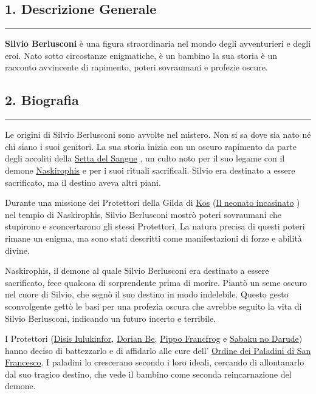 \subsection{1. Descrizione Generale}\label{descrizione-generale}

\begin{center}\rule{0.5\linewidth}{0.5pt}\end{center}

\textbf{Silvio Berlusconi} è una figura straordinaria nel mondo degli
avventurieri e degli eroi. Nato sotto circostanze enigmatiche, è un
bambino la sua storia è un racconto avvincente di rapimento, poteri
sovraumani e profezie oscure.

\subsection{2. Biografia}\label{biografia}

\begin{center}\rule{0.5\linewidth}{0.5pt}\end{center}

Le origini di Silvio Berlusconi sono avvolte nel mistero. Non si sa dove
sia nato né chi siano i suoi genitori. La sua storia inizia con un
oscuro rapimento da parte degli accoliti della
\href{Setta\%20del\%20Sangue\%202859c4de945546eda0cee6fb151ef956.md}{Setta
del Sangue} , un culto noto per il suo legame con il demone
\href{Naskirophis\%20120e02c652b84f2abeac36fef59c28f6.md}{Naskirophis} e
per i suoi rituali sacrificali. Silvio era destinato a essere
sacrificato, ma il destino aveva altri piani.

Durante una missione dei Protettori della Gilda di
\href{Kos\%20bb2884f1df2e4e47890b8cefddb5e4bd.md}{Kos}
(\href{Il\%20neonato\%20incasinato\%2090743e94446c4f5a846f18c37fd80698.md}{Il
neonato incasinato} ) nel tempio di Naskirophis, Silvio Berlusconi
mostrò poteri sovraumani che stupirono e sconcertarono gli stessi
Protettori. La natura precisa di questi poteri rimane un enigma, ma sono
stati descritti come manifestazioni di forze e abilità divine.

Naskirophis, il demone al quale Silvio Berlusconi era destinato a essere
sacrificato, fece qualcosa di sorprendente prima di morire. Piantò un
seme oscuro nel cuore di Silvio, che segnò il suo destino in modo
indelebile. Questo gesto sconvolgente gettò le basi per una profezia
oscura che avrebbe seguito la vita di Silvio Berlusconi, indicando un
futuro incerto e terribile.

I Protettori
(\href{Disis\%20Iulukinfor\%20e7699726707a41be926c823d67941f78.md}{Disis
Iulukinfor},
\href{Dorian\%20Be\%20af030367f8054333912b2dca0de16d6f.md}{Dorian Be},
\href{Pippo\%20Francfrog\%204d15378e582d4f1db815d957fe064245.md}{Pippo
Francfrog} e
\href{Sabaku\%20no\%20Darude\%209c414f3e551144f4acee665cab478336.md}{Sabaku
no Darude}) hanno deciso di battezzarlo e di affidarlo alle cure dell'
\href{Ordine\%20dei\%20Paladini\%20di\%20San\%20Francesco\%20e8fd423783714ddeb11ec757edea519b.md}{Ordine
dei Paladini di San Francesco}. I paladini lo crescerano secondo i loro
ideali, cercando di allontanarlo dal suo tragico destino, che vede il
bambino come seconda reincarnazione del demone.

